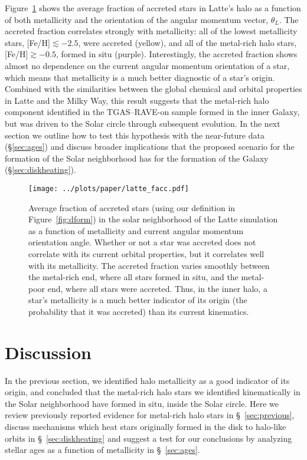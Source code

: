 \documentclass[apj, twocolappendix, numberedappendix, appendixfloats]{emulateapj}
\begin{document}
Figure~\ref{fig:facc} shows the average fraction of accreted stars in Latte's halo as a function of both metallicity and the orientation of the angular momentum vector, $\theta_L$.
The accreted fraction correlates strongly with metallicity: all of the lowest metallicity stars, [Fe/H]$\lesssim-2.5$, were accreted (yellow), and all of the metal-rich halo stars, [Fe/H]$\gtrsim-0.5$, formed in situ (purple).
Interestingly, the accreted fraction shows almost no dependence on the current angular momentum orientation of a star, which means that metallicity is a much better diagnostic of a star's origin.
Combined with the similarities between the global chemical and orbital properties in Latte and the Milky Way, this result suggests that the metal-rich halo component identified in the TGAS--RAVE-on sample formed in the inner Galaxy, but was driven to the Solar circle through subsequent evolution.
In the next section we outline how to test this hypothesis with the near-future data (\S\ref{sec:ages}) and discuss broader implications that the proposed scenario for the formation of the Solar neighborhood has for the formation of the Galaxy (\S\ref{sec:diskheating}).

\begin{figure}
\begin{center}
\texttt{[image: ../plots/paper/latte\_facc.pdf]}
\caption{Average fraction of accreted stars (using our definition in Figure~\ref{fig:dform}) in the solar neighborhood of the Latte simulation as a function of metallicity and current angular momentum orientation angle.
Whether or not a star was accreted does not correlate with its current orbital properties, but it correlates well with its metallicity.
The accreted fraction varies smoothly between the metal-rich end, where all stars formed in situ, and the metal-poor end, where all stars were accreted.
Thus, in the inner halo, a star's metallicity is a much better indicator of its origin (the probability that it was accreted) than its current kinematics.
}
\label{fig:facc}
\end{center}
\end{figure}

\section{Discussion}

In the previous section, we identified halo metallicity as a good indicator of its origin, and concluded that the metal-rich halo stars we identified kinematically in the Solar neighborhood have formed in situ, inside the Solar circle.
Here we review previously reported evidence for metal-rich halo stars in \S~\ref{sec:previous}, discuss mechanisms which heat stars originally formed in the disk to halo-like orbits in \S~\ref{sec:diskheating} and suggest a test for our conclusions by analyzing stellar ages as a function of metallicity in \S~\ref{sec:ages}.
\end{document}
